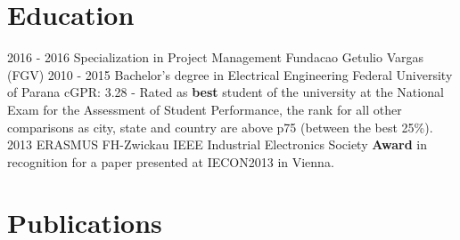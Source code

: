 \documentclass[]{friggeri-cv}
\begin{document}
\section{Education}
\begin{entrylist}
  \entry
    {2016 - 2016}
    {Specialization in Project Management}
    {Fundacao Getulio Vargas (FGV)}
    {}
  \entry
    {2010 - 2015}
    {Bachelor's degree in Electrical Engineering}
    {Federal University of Parana}
    {cGPR: 3.28 - Rated as \textbf{best} student of the university at the National Exam for the Assessment of Student Performance, the rank for all other comparisons as city, state and country are above p75 (between the best 25\%). \\}
  \entry
    {2013}
    {ERASMUS}
    {FH-Zwickau}
    {IEEE Industrial Electronics Society \textbf{Award} in recognition for a paper presented at IECON2013 in Vienna.}
\end{entrylist}

%


\section{Publications}
\end{document}
